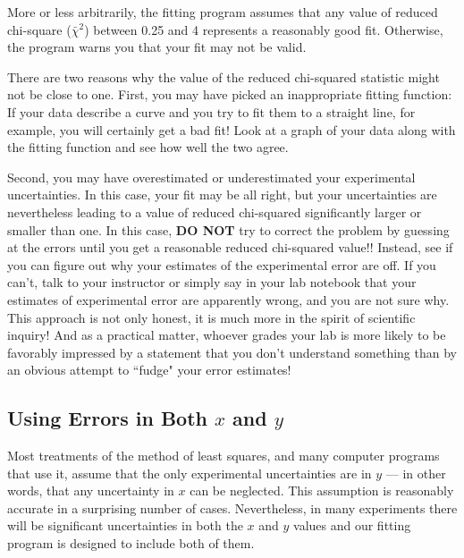 More or less arbitrarily, the fitting
program assumes that any value of reduced chi-square
($\bar{\chi}^2$) between 0.25 and 4 represents a
reasonably good fit.  Otherwise, the program warns you that your fit
may not be valid.

There are two reasons why the value of the reduced
chi-squared statistic might not be close to one.  First, you may have
picked an inappropriate fitting function: If your data describe a
curve and you try to fit them to a straight line, for example, you
will certainly get a bad fit!  Look at a graph of your data along with
the fitting function and see how well the two agree.

Second, you may have overestimated or underestimated your experimental
uncertainties.  In this case, your fit may be all right, but your
uncertainties are nevertheless leading to a value of reduced
chi-squared significantly larger or smaller than one.  In this case,
{\bf DO NOT} try to correct the problem by guessing at the errors until you
get a reasonable reduced chi-squared value!!  Instead, see if you can
figure out why your estimates of the experimental error are off.  If
you can't, talk to your instructor or simply say in your lab notebook
that your estimates of experimental error are apparently wrong, and
you are not sure why.  This approach is not only honest, it is much
more in the spirit of scientific inquiry!  And as a practical matter,
whoever grades your lab is more likely to be favorably impressed by a statement
that you don't understand something than by an obvious attempt to
``fudge" your error estimates!



\subsection*{Using Errors in Both $x$ and $y$}

Most treatments of the method of least squares, and many computer
programs that use it, assume that the only experimental uncertainties
are in $y$ --- in other words, that any uncertainty in $x$ can be
neglected.  This assumption is reasonably accurate in a surprising
number of cases.  Nevertheless, in many experiments there will be
significant uncertainties in both the $x$ and $y$ values and our fitting
program is designed to include both of them.  

